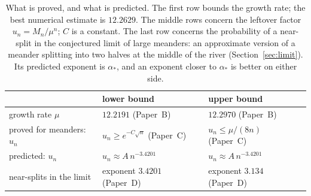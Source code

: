 \begin{table}[h]
\centering
\begin{tabular}{lll}
\toprule
 & lower bound & upper bound \\
\midrule
growth rate $\mu$ & $12.2191$ (Paper~B) & $12.2970$ (Paper~B) \\
proved for meanders: $u_n$ & $u_n\ge e^{-C\sqrt n}$ (Paper~C) & $u_n\le \mu/(8n)$ (Paper~C) \\
predicted: $u_n$ & $u_n\approx A\,n^{-3.4201}$ & $u_n\approx A\,n^{-3.4201}$\\
near-splits in the limit & exponent $3.4201$ (Paper~D) & exponent $3.134$ (Paper~D)\\
\bottomrule
\end{tabular}
\caption{What is proved, and what is predicted. The first row bounds the growth rate; the best
numerical estimate is $12.2629$. The middle rows concern the leftover factor $u_n=M_n/\mu^n$; $C$
is a constant. The last row concerns
the probability of a near-split in the conjectured limit of large meanders: an approximate
version of a meander splitting into two halves at the middle of the river
(Section~\ref{sec:limit}). Its predicted exponent is $\alpha_*$, and an exponent closer to
$\alpha_*$ is better on either side.}
\label{tab:window}
\end{table}

